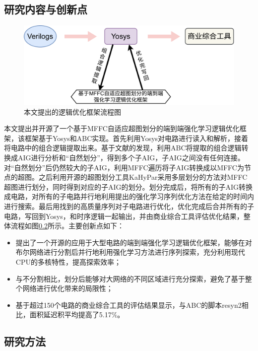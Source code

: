 \subsection{研究内容与创新点}

\begin{figure}[!htbp]
    \centering
    \includegraphics[width=\linewidth]{./figs/LS-MFFC_rl.pdf}
    \caption{本文提出的逻辑优化框架流程图}
    \label{LS:MFFC_rl}
\end{figure}

本文提出并开源了一个基于MFFC自适应超图划分的端到端强化学习逻辑优化框架，该框架基于Yosys\cite{LS:yosys}和ABC\cite{LS:ABC}实现。首先利用Yosys对电路进行读入和解析，接着将电路中的组合逻辑提取出来。基于文献\cite{Moucheng_Yang}的发现，利用ABC将提取的组合逻辑转换成AIG进行分析和“自然划分”，得到多个子AIG，子AIG之间没有任何连接。对“自然划分”后仍然较大的子AIG，利用MFFC遍历将子AIG转换成以MFFC为节点的超图。之后利用开源的超图划分工具KaHyPar\cite{KaHyPar}采用多层划分的方法对MFFC超图进行划分，同时得到对应的子AIG的划分。划分完成后，将所有的子AIG转换成电路，对所有的子电路并行地利用提出的强化学习序列优化方法在给定的时间内进行搜索。最后用找到的高质量序列对子电路进行优化，优化完成后合并所有的子电路，写回到Yosys，和时序逻辑一起输出，并由商业综合工具评估优化结果，整体流程如图\ref{}所示。主要创新点如下：
\begin{itemize}
    \item 提出了一个开源的应用于大型电路的端到端强化学习逻辑优化框架，能够在对布尔网络进行分割后并行地利用强化学习方法进行序列探索，充分利用现代CPU的多核特性，提高探索效率；
    \item 与不分割相比，划分后能够对大网络的不同区域进行充分探索，避免了基于整个网络进行优化带来的局限性；
    \item 基于超过150个电路的商业综合工具的评估结果显示，与ABC的脚本resyn2相比，面积延迟积平均提高了5.17\%。
\end{itemize}

\subsection{研究方法}

